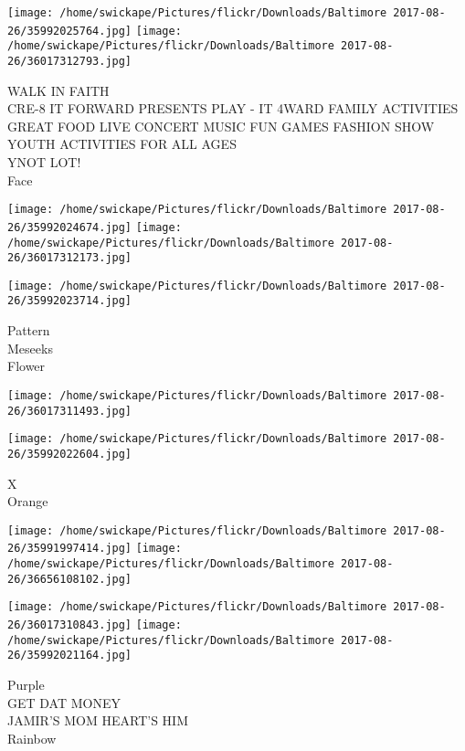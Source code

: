 \documentclass[10pt,letterpaper]{article}
\begin{document}
\texttt{[image: /home/swickape/Pictures/flickr/Downloads/Baltimore 2017-08-26/35992025764.jpg]}
\texttt{[image: /home/swickape/Pictures/flickr/Downloads/Baltimore 2017-08-26/36017312793.jpg]}

WALK IN FAITH\\
CRE{-}8 IT FORWARD PRESENTS PLAY {-} IT 4WARD FAMILY ACTIVITIES GREAT FOOD LIVE CONCERT MUSIC FUN GAMES FASHION SHOW YOUTH ACTIVITIES FOR ALL AGES\\
YNOT LOT!\\
Face\\
\pagebreak

\texttt{[image: /home/swickape/Pictures/flickr/Downloads/Baltimore 2017-08-26/35992024674.jpg]}
\texttt{[image: /home/swickape/Pictures/flickr/Downloads/Baltimore 2017-08-26/36017312173.jpg]}

\vspace{0.25in}
\texttt{[image: /home/swickape/Pictures/flickr/Downloads/Baltimore 2017-08-26/35992023714.jpg]}

Pattern\\
Meseeks\\
Flower\\
\pagebreak

\texttt{[image: /home/swickape/Pictures/flickr/Downloads/Baltimore 2017-08-26/36017311493.jpg]}

\vspace{0.25in}
\texttt{[image: /home/swickape/Pictures/flickr/Downloads/Baltimore 2017-08-26/35992022604.jpg]}

X\\
Orange\\
\pagebreak

\texttt{[image: /home/swickape/Pictures/flickr/Downloads/Baltimore 2017-08-26/35991997414.jpg]}
\texttt{[image: /home/swickape/Pictures/flickr/Downloads/Baltimore 2017-08-26/36656108102.jpg]}

\texttt{[image: /home/swickape/Pictures/flickr/Downloads/Baltimore 2017-08-26/36017310843.jpg]}
\texttt{[image: /home/swickape/Pictures/flickr/Downloads/Baltimore 2017-08-26/35992021164.jpg]}

Purple\\
GET DAT MONEY\\
JAMIR'S MOM HEART'S HIM\\
Rainbow\\
\pagebreak
\end{document}
